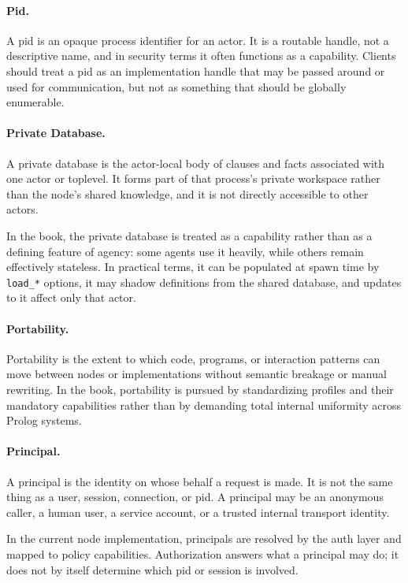 \paragraph{Pid.}
A pid is an opaque process identifier for an actor. It is a routable handle, not
a descriptive name, and in security terms it often functions as a capability.
Clients should treat a pid as an implementation handle that may be passed around
or used for communication, but not as something that should be globally
enumerable.

\paragraph{Private Database.}
A private database is the actor-local body of clauses and facts associated with
one actor or toplevel. It forms part of that process's private workspace rather
than the node's shared knowledge, and it is not directly accessible to other
actors.

In the book, the private database is treated as a capability rather than as a
defining feature of agency: some agents use it heavily, while others remain
effectively stateless. In practical terms, it can be populated at spawn time by
\texttt{load\_*} options, it may shadow definitions from the shared database,
and updates to it affect only that actor.

\paragraph{Portability.}
Portability is the extent to which code, programs, or interaction patterns can
move between nodes or implementations without semantic breakage or manual
rewriting. In the book, portability is pursued by standardizing profiles and
their mandatory capabilities rather than by demanding total internal uniformity
across Prolog systems.

\paragraph{Principal.}
A principal is the identity on whose behalf a request is made. It is not the
same thing as a user, session, connection, or pid. A principal may be an
anonymous caller, a human user, a service account, or a trusted internal
transport identity.

In the current node implementation, principals are resolved by the auth layer
and mapped to policy capabilities. Authorization answers what a principal may
do; it does not by itself determine which pid or session is involved.

